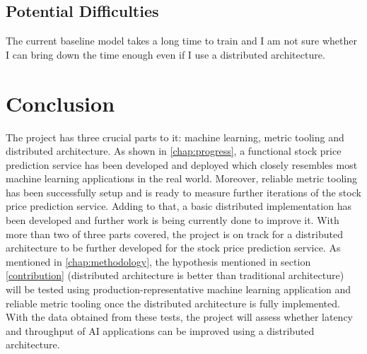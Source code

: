 \documentclass{report}
\def\backmatter{%
    \setcounter{section}{0}
    \renewcommand{\thesection}{\Alph{section}}
}%
\begin{document}
\section{Potential Difficulties}
The current baseline model takes a long time to train and I am not sure whether I can bring down the time enough even if I use a distributed architecture.

\chapter{Conclusion}\label{chap:conclusion}
The project has three crucial parts to it: machine learning, metric tooling and distributed architecture.
As shown in \cref{chap:progress}, a functional stock price prediction service has been developed and deployed which closely resembles most machine learning applications in the real world.
Moreover, reliable metric tooling has been successfully setup and is ready to measure further iterations of the stock price prediction service.
Adding to that, a basic distributed implementation has been developed and further work is being currently done to improve it.
With more than two of three parts covered, the project is on track for a distributed architecture to be further developed for the stock price prediction service.
As mentioned in \cref{chap:methodology}, the hypothesis mentioned in section \ref{contribution} (distributed architecture is better than traditional architecture) will be tested using production-representative machine learning application and reliable metric tooling once the distributed architecture is fully implemented.
With the data obtained from these tests, the project will assess whether latency and throughput of AI applications can be improved using a distributed architecture.

\backmatter

\printbibliography
\end{document}
